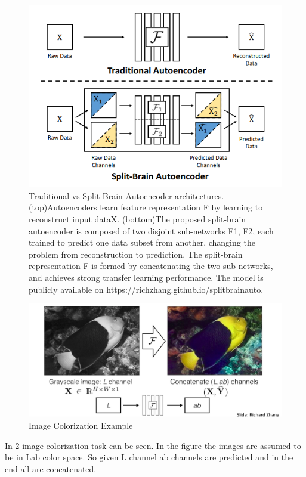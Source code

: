 \documentclass{article}
\begin{document}
\begin{figure}[H]
   \centering
   \includegraphics[width=0.8\linewidth]{figures/cross-channel-ae.png}
   \caption{Traditional  vs  Split-Brain  Autoencoder  architectures.
   (top)Autoencoders learn feature representation F
   by learning to reconstruct input dataX.
   (bottom)The proposed split-brain autoencoder
   is composed of two disjoint sub-networks
   F1, F2, each trained to predict one
   data subset from another, changing  the  problem 
   from reconstruction to prediction.
   The split-brain representation F
   is formed by concatenating the two sub-networks,
   and achieves strong transfer
   learning performance.
   The model is publicly available
   on https://richzhang.github.io/splitbrainauto.}
   \label{fig:split-brain}
   \end{figure}
 
\begin{figure}[H]
       \centering
       \includegraphics[width=0.8\linewidth]{figures/cross-channel-example.png}
       \caption{Image Colorization Example}
       \label{fig:cross-channel-example}
       \end{figure}
 
In \ref{fig:cross-channel-example} image colorization task can be seen.
In the figure the images are assumed to be in Lab color space.
So given L channel ab channels are predicted and in the end all
are concatenated.
 
\end{document}
